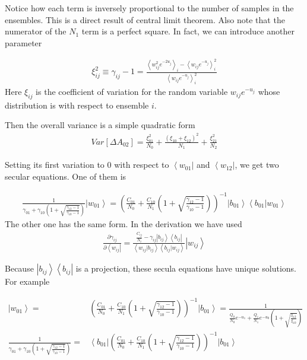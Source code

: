 \documentclass[notitlepage, amsmath, amssymb, aps]{revtex4-1}
\begin{document}
Notice how each term is inversely proportional to the number of samples in the ensembles.
This is a direct result of central limit theorem.
Also note that the numerator of the $N_1$ term is a perfect square.
In fact, we can introduce another parameter

\begin{align}
    \xi^2_{ij} \equiv \gamma_{ij} - 1
     = \frac{\left<w_{ij}^2e^{-2u_j}\right>_i- \left<w_{ij}e^{-u_j} \right>_i^2}{\left<w_{ij}e^{-u_j} \right>_i^2}
\end{align}
Here $\xi_{ij}$ is the coefficient of variation for the random variable $w_{ij}e^{-u_j}$ whose distribution is with respect to ensemble $i$.

Then the overall variance is a simple quadratic form
\begin{align}
    Var[\Delta A_{02}] = \frac{\xi^2_{01}}{N_0} + \frac{(\xi_{10}+\xi_{12})^2}{N_1} + \frac{\xi^2_{21}}{N_2}
\end{align}

Setting its first variation to 0 with respect to $\left<w_{01}\right|$ and $\left<w_{12}\right|$, we get two secular equations.
One of them is

\begin{align}
    \frac{1}{\gamma_{01}+\gamma_{10}\left(1+\sqrt{\frac{\gamma_{12}-1}{\gamma_{10}-1}}\right)} \left|w_{01}\right> 
    = \left(\frac{C_{01}}{N_0}+\frac{C_{10}}{N_1}\left(1+\sqrt{\frac{\gamma_{12}-1}{\gamma_{10}-1}}\right) \right)^{-1} \left|b_{01}\right>\left<b_{01}|w_{01}\right> 
\end{align}
The other one has the same form.
In the derivation we have used
\begin{align}
    \frac{\partial\gamma_{ij}}{\partial \left<w_{ij}\right|} = \frac{\frac{C_{ij}}{N_i} - \gamma_{ij}\left|b_{ij}\right>\left<b_{ij}\right|}{\left<w_{ij}|b_{ij}\right>\left<b_{ij}|w_{ij} \right>}\left|w_{ij}\right>
\end{align}

Because $\left|b_{ij}\right>\left<b_{ij}\right|$ is a projection, these secula equations have unique solutions.
For example

\begin{align}
    \left|w_{01}\right> = & \left(\frac{C_{01}}{N_0} + \frac{C_{10}}{N_1}\left(1+ \sqrt{\frac{\gamma_{12}-1}{\gamma_{10}-1}}\right) \right)^{-1}\left|b_{01}\right>
    =\frac{1}{\frac{Q_0}{N_0}e^{-u_1} + \frac{Q_1}{N_1}e^{-u_0}\left(1+\sqrt{\frac{\xi_{12}}{\xi_{10}}} \right)} \label{eq:w01} \\
    \frac{1}{\gamma_{01} + \gamma_{10}\left(1+\sqrt{\frac{\gamma_{12}-1}{\gamma_{10}-1}} \right)} = & 
    \left<b_{01}\right| \left(\frac{C_{01}}{N_0} + \frac{C_{10}}{N_1}\left(1+\sqrt{\frac{\gamma_{12}-1}{\gamma_{10}-1}} \right) \right)^{-1}\left|b_{01}\right>
\end{align}
\end{document}
